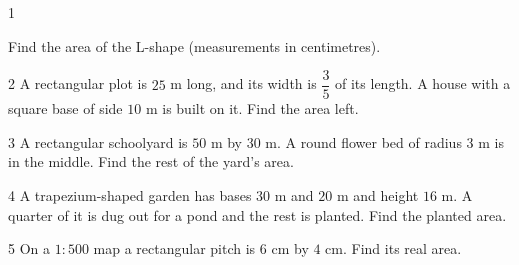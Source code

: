 \begin{probbox}{1}{\relax}
\begin{minipage}[t]{0.66\linewidth}
Find the area of the L-shape (measurements in centimetres).
\end{minipage}\hfill
\begin{minipage}[t]{0.3\linewidth}\vspace{0pt}\centering
{}
\end{minipage}
\end{probbox}
\gap
\begin{probbox}{2}{\relax}
A rectangular plot is $25$ m long, and its width is $\dfrac35$ of its length. A house with a square base of side $10$ m is built on it. Find the area left.
\end{probbox}
\gap
\begin{probbox}{3}{\relax}
A rectangular schoolyard is $50$ m by $30$ m. A round flower bed of radius $3$ m is in the middle. Find the rest of the yard's area.
\end{probbox}
\gap
\begin{probbox}{4}{\relax}
A trapezium-shaped garden has bases $30$ m and $20$ m and height $16$ m. A quarter of it is dug out for a pond and the rest is planted. Find the planted area.
\end{probbox}
\gap
\begin{probbox}{5}{\relax}
On a $1:500$ map a rectangular pitch is $6$ cm by $4$ cm. Find its real area.
\end{probbox}
